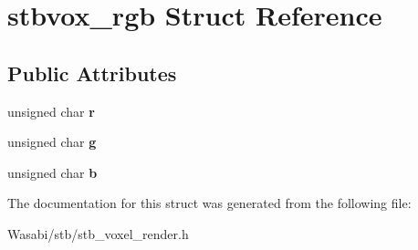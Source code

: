 \hypertarget{structstbvox__rgb}{}\section{stbvox\+\_\+rgb Struct Reference}
\label{structstbvox__rgb}
\subsection*{Public Attributes}
\begin{DoxyCompactItemize}
\item 
unsigned char {\bfseries r}\hypertarget{structstbvox__rgb_ac9a4346b73ec4279a0f6315ce3a379c3}{}\label{structstbvox__rgb_ac9a4346b73ec4279a0f6315ce3a379c3}

\item 
unsigned char {\bfseries g}\hypertarget{structstbvox__rgb_a6de16b9a3e84c4359632b10e9730fd80}{}\label{structstbvox__rgb_a6de16b9a3e84c4359632b10e9730fd80}

\item 
unsigned char {\bfseries b}\hypertarget{structstbvox__rgb_a44bd1b9b00114188f8f4f8636bccd052}{}\label{structstbvox__rgb_a44bd1b9b00114188f8f4f8636bccd052}

\end{DoxyCompactItemize}


The documentation for this struct was generated from the following file\+:\begin{DoxyCompactItemize}
\item 
Wasabi/stb/stb\+\_\+voxel\+\_\+render.\+h\end{DoxyCompactItemize}
